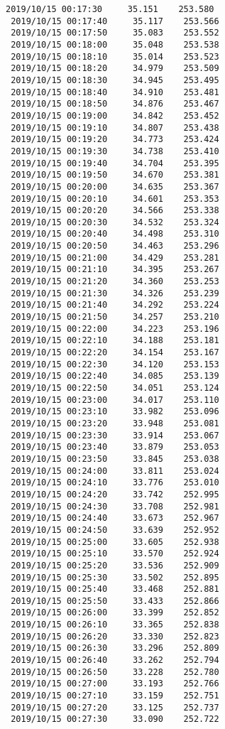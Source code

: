 \documentclass[11pt]{article}
\begin{document}
\begin{Verbatim}[commandchars=\\\{\}]
 2019/10/15 00:17:30     35.151    253.580
 2019/10/15 00:17:40     35.117    253.566
 2019/10/15 00:17:50     35.083    253.552
 2019/10/15 00:18:00     35.048    253.538
 2019/10/15 00:18:10     35.014    253.523
 2019/10/15 00:18:20     34.979    253.509
 2019/10/15 00:18:30     34.945    253.495
 2019/10/15 00:18:40     34.910    253.481
 2019/10/15 00:18:50     34.876    253.467
 2019/10/15 00:19:00     34.842    253.452
 2019/10/15 00:19:10     34.807    253.438
 2019/10/15 00:19:20     34.773    253.424
 2019/10/15 00:19:30     34.738    253.410
 2019/10/15 00:19:40     34.704    253.395
 2019/10/15 00:19:50     34.670    253.381
 2019/10/15 00:20:00     34.635    253.367
 2019/10/15 00:20:10     34.601    253.353
 2019/10/15 00:20:20     34.566    253.338
 2019/10/15 00:20:30     34.532    253.324
 2019/10/15 00:20:40     34.498    253.310
 2019/10/15 00:20:50     34.463    253.296
 2019/10/15 00:21:00     34.429    253.281
 2019/10/15 00:21:10     34.395    253.267
 2019/10/15 00:21:20     34.360    253.253
 2019/10/15 00:21:30     34.326    253.239
 2019/10/15 00:21:40     34.292    253.224
 2019/10/15 00:21:50     34.257    253.210
 2019/10/15 00:22:00     34.223    253.196
 2019/10/15 00:22:10     34.188    253.181
 2019/10/15 00:22:20     34.154    253.167
 2019/10/15 00:22:30     34.120    253.153
 2019/10/15 00:22:40     34.085    253.139
 2019/10/15 00:22:50     34.051    253.124
 2019/10/15 00:23:00     34.017    253.110
 2019/10/15 00:23:10     33.982    253.096
 2019/10/15 00:23:20     33.948    253.081
 2019/10/15 00:23:30     33.914    253.067
 2019/10/15 00:23:40     33.879    253.053
 2019/10/15 00:23:50     33.845    253.038
 2019/10/15 00:24:00     33.811    253.024
 2019/10/15 00:24:10     33.776    253.010
 2019/10/15 00:24:20     33.742    252.995
 2019/10/15 00:24:30     33.708    252.981
 2019/10/15 00:24:40     33.673    252.967
 2019/10/15 00:24:50     33.639    252.952
 2019/10/15 00:25:00     33.605    252.938
 2019/10/15 00:25:10     33.570    252.924
 2019/10/15 00:25:20     33.536    252.909
 2019/10/15 00:25:30     33.502    252.895
 2019/10/15 00:25:40     33.468    252.881
 2019/10/15 00:25:50     33.433    252.866
 2019/10/15 00:26:00     33.399    252.852
 2019/10/15 00:26:10     33.365    252.838
 2019/10/15 00:26:20     33.330    252.823
 2019/10/15 00:26:30     33.296    252.809
 2019/10/15 00:26:40     33.262    252.794
 2019/10/15 00:26:50     33.228    252.780
 2019/10/15 00:27:00     33.193    252.766
 2019/10/15 00:27:10     33.159    252.751
 2019/10/15 00:27:20     33.125    252.737
 2019/10/15 00:27:30     33.090    252.722

\end{Verbatim}
\end{document}
